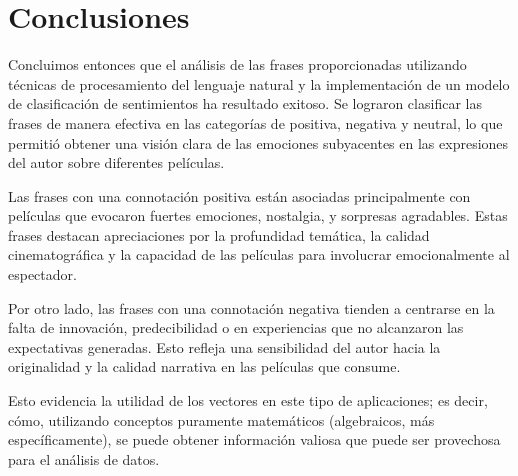 \documentclass{article}
\begin{document}
    \section{Conclusiones}
    Concluimos entonces que el análisis de las frases proporcionadas utilizando técnicas de procesamiento del lenguaje natural y la implementación de un modelo de clasificación de sentimientos ha resultado exitoso. Se lograron clasificar las frases de manera efectiva en las categorías de positiva, negativa y neutral, lo que permitió obtener una visión clara de las emociones subyacentes en las expresiones del autor sobre diferentes películas.

    Las frases con una connotación positiva están asociadas principalmente con películas que evocaron fuertes emociones, nostalgia, y sorpresas agradables. Estas frases destacan apreciaciones por la profundidad temática, la calidad cinematográfica y la capacidad de las películas para involucrar emocionalmente al espectador.

    Por otro lado, las frases con una connotación negativa tienden a centrarse en la falta de innovación, predecibilidad o en experiencias que no alcanzaron las expectativas generadas. Esto refleja una sensibilidad del autor hacia la originalidad y la calidad narrativa en las películas que consume.

    Esto evidencia la utilidad de los vectores en este tipo de aplicaciones; es decir, cómo, utilizando conceptos puramente matemáticos (algebraicos, más específicamente), se puede obtener información valiosa que puede ser provechosa para el análisis de datos.
\end{document}
